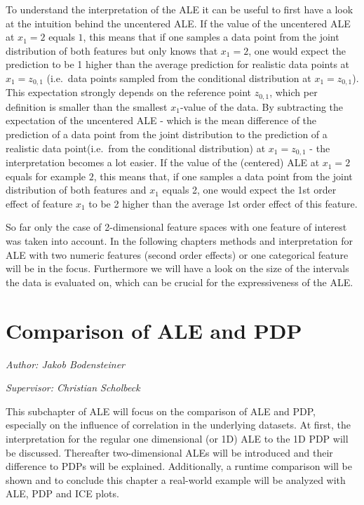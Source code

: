 \documentclass[]{krantz}
\begin{document}
To understand the interpretation of the ALE it can be useful to first
have a look at the intuition behind the uncentered ALE. If the value of
the uncentered ALE at \(x_1 = 2\) equals \(1\), this means that if one
samples a data point from the joint distribution of both features but
only knows that \(x_1 = 2\), one would expect the prediction to be 1
higher than the average prediction for realistic data points at
\(x_1 = z_{0,1}\) (i.e.~data points sampled from the conditional
distribution at \(x_1 = z_{0,1}\)). This expectation strongly depends on
the reference point \(z_{0,1}\), which per definition is smaller than
the smallest \(x_1\)-value of the data. By subtracting the expectation
of the uncentered ALE - which is the mean difference of the prediction
of a data point from the joint distribution to the prediction of a
realistic data point(i.e.~from the conditional distribution) at
\(x_1 = z_{0,1}\) - the interpretation becomes a lot easier. If the
value of the (centered) ALE at \(x_1 = 2\) equals for example \(2\),
this means that, if one samples a data point from the joint distribution
of both features and \(x_1\) equals 2, one would expect the 1st order
effect of feature \(x_1\) to be 2 higher than the average 1st order
effect of this feature.

So far only the case of 2-dimensional feature spaces with one feature of
interest was taken into account. In the following chapters methods and
interpretation for ALE with two numeric features (second order effects)
or one categorical feature will be in the focus. Furthermore we will
have a look on the size of the intervals the data is evaluated on, which
can be crucial for the expressiveness of the ALE.

\chapter{Comparison of ALE and PDP}\label{ale-pdp}

\emph{Author: Jakob Bodensteiner}

\emph{Supervisor: Christian Scholbeck}

This subchapter of ALE will focus on the comparison of ALE and PDP,
especially on the influence of correlation in the underlying datasets.
At first, the interpretation for the regular one dimensional (or 1D) ALE
to the 1D PDP will be discussed. Thereafter two-dimensional ALEs will be
introduced and their difference to PDPs will be explained. Additionally,
a runtime comparison will be shown and to conclude this chapter a
real-world example will be analyzed with ALE, PDP and ICE plots.
\end{document}
